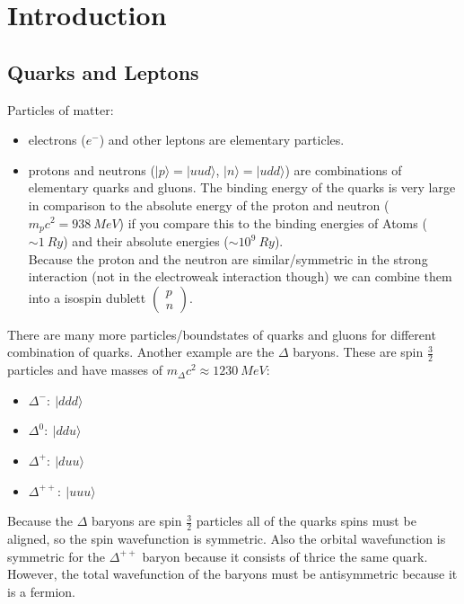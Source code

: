 \documentclass{include/thesisclass}
\newcommand{\rk}{\rangle}
\newcommand{\vektorz}[2]{\begin{pmatrix} #1 \\ #2 \end{pmatrix}}
\begin{document}
    \FrontMatter

    
    
    \begingroup \let\clearpage\relax    %
    \tableofcontents                    %
    \endgroup



    \MainMatter
\chapter{Introduction}
\section{Quarks and Leptons}
Particles of matter:
\begin{itemize}
	\item electrons ($e^-$) and other leptons are elementary particles. 
	\item protons and neutrons ($|p\rk = |uud\rk$, $|n\rk = |udd\rk$) are combinations of elementary quarks and gluons. The binding energy of the quarks is very large in comparison to the absolute energy of the proton and neutron ($m_pc^2 = 938~\si{MeV}$) if you compare this to the binding energies of Atoms ($\sim 1~\si{Ry}$) and their absolute energies ($\sim 10^9~\si{Ry}$).\\
		Because the proton and the neutron are similar/symmetric in the strong interaction (not in the electroweak interaction though) we can combine them into a isospin dublett $\vektorz{p}{n}$.
\end{itemize}
There are many more particles/boundstates of quarks and gluons for different combination of quarks. Another example are the $\Delta$ baryons. These are spin $\frac{3}{2}$ particles and have masses of $m_\Delta c^2 \approx 1230 ~\si{MeV}$:
\begin{itemize}
	\item $\Delta^-:~|ddd\rk$
	\item $\Delta^0:~|ddu\rk$
	\item $\Delta^+:~|duu\rk$
	\item $\Delta^{++}:~|uuu\rk$
\end{itemize}
Because the $\Delta$ baryons are spin $\frac{3}{2}$ particles all of the quarks spins must be aligned, so the spin wavefunction is symmetric. Also the orbital wavefunction is symmetric for the $\Delta^{++}$ baryon because it consists of thrice the same quark. However, the total wavefunction of the baryons must be antisymmetric because it is a fermion.\\
\end{document}
